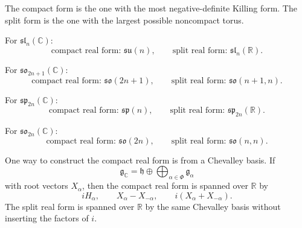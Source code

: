 \documentclass[12pt]{article}
\begin{document}
The compact form is the one with the most negative-definite Killing form. The split form is the one with the largest possible noncompact torus.


\begin{example}
    For $\mathfrak{sl}_n(\mathbb C)$:
    \[
        \text{compact real form: }\mathfrak{su}(n),
        \qquad
        \text{split real form: }\mathfrak{sl}_n(\mathbb R).
    \]
\end{example}

\begin{example}
    For $\mathfrak{so}_{2n+1}(\mathbb C)$:
    \[
        \text{compact real form: }\mathfrak{so}(2n+1),
        \qquad
        \text{split real form: }\mathfrak{so}(n+1,n).
    \]
\end{example}

\begin{example}
    For $\mathfrak{sp}_{2n}(\mathbb C)$:
    \[
        \text{compact real form: }\mathfrak{sp}(n),
        \qquad
        \text{split real form: }\mathfrak{sp}_{2n}(\mathbb R).
    \]
\end{example}

\begin{example}
    For $\mathfrak{so}_{2n}(\mathbb C)$:
    \[
        \text{compact real form: }\mathfrak{so}(2n),
        \qquad
        \text{split real form: }\mathfrak{so}(n,n).
    \]
\end{example}

One way to construct the compact real form is from a Chevalley basis. If
\[
    \mathfrak g_\mathbb C = \mathfrak h \oplus \bigoplus_{\alpha\in \Phi}\mathfrak g_\alpha
\]
with root vectors $X_\alpha$, then the compact real form is spanned over $\mathbb R$ by
\[
    iH_\alpha,\qquad X_\alpha-X_{-\alpha},\qquad i(X_\alpha+X_{-\alpha}).
\]
The split real form is spanned over $\mathbb R$ by the same Chevalley basis without inserting the factors of $i$.
\end{document}
